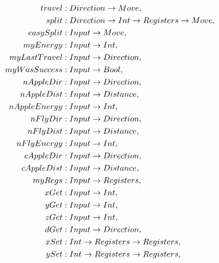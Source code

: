 \documentclass[12pt,a4paper]{report}
\begin{document}
\begin{align*}
travel           &: Direction \ar Move                              ,\\          
split            &: Direction \ar Int \ar Registers \ar Move        ,\\       
easySplit        &: Input \ar Move                                  ,\\     
myEnergy         &: Input \ar Int                                   ,\\     
myLastTravel     &: Input \ar Direction                             ,\\                
myWasSuccess     &: Input \ar Bool                                  ,\\      
nAppleDir        &: Input \ar Direction                             ,\\                    
nAppleDist       &: Input \ar Distance                              ,\\                   
nAppleEnergy     &: Input \ar Int                                   ,\\              
nFlyDir          &: Input \ar Direction                             ,\\                      
nFlyDist         &: Input \ar Distance                              ,\\                    
nFlyEnergy       &: Input \ar Int                                   ,\\              
cAppleDir        &: Input \ar Direction                             ,\\          
cAppleDist       &: Input \ar Distance                              ,\\        
myRegs           &: Input \ar Registers                             ,\\         
xGet             &: Input \ar Int                                   ,\\     
yGet             &: Input \ar Int                                   ,\\     
zGet             &: Input \ar Int                                   ,\\     
dGet             &: Input \ar Direction                             ,\\          
xSet             &: Int \ar Registers \ar Registers                 ,\\          
ySet             &: Int \ar Registers \ar Registers                 ,\\          

\end{align*}
\end{document}
